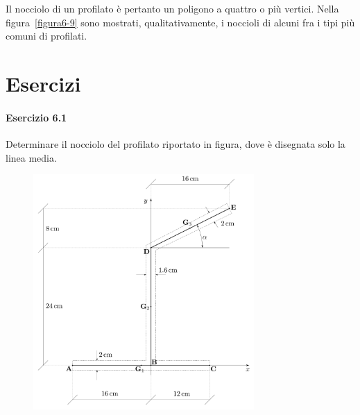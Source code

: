 \noindent Il nocciolo di un profilato è pertanto un poligono a quattro o più vertici. Nella figura~\ref{figura6-9} sono mostrati, qualitativamente, i noccioli di alcuni fra i tipi più comuni di profilati.
\clearpage
\section{Esercizi}
\paragraph{Esercizio 6.1}
Determinare il nocciolo del profilato riportato in figura, dove è disegnata solo la linea media.
\renewcommand{\thefigure}{6.1~-~1}
\begin{figure}[ht]
\centering
\includegraphics[width=0.75\textwidth]{Immagini/Parte_6/Esercizio6_1/Esercizio6_1_1.pdf}
\caption{}
\label{Esercizio6-1-1}
\end{figure}

